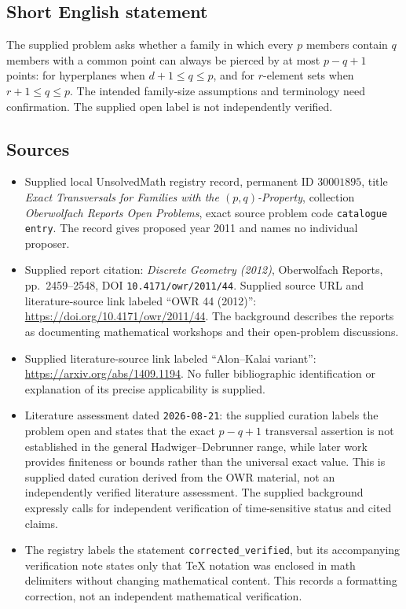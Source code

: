 \documentclass[11pt]{article}
\begin{document}
\subsection{Short English statement}
The supplied problem asks whether a family in which every \(p\) members contain \(q\) members with a common point can always be pierced by at most \(p-q+1\) points: for hyperplanes when \(d+1\le q\le p\), and for \(r\)-element sets when \(r+1\le q\le p\). The intended family-size assumptions and terminology need confirmation. The supplied open label is not independently verified.
\subsection{Sources}
\begin{itemize}
\item Supplied local UnsolvedMath registry record, permanent ID \(30001895\), title \emph{Exact Transversals for Families with the \((p,q)\)-Property}, collection \emph{Oberwolfach Reports Open Problems}, exact source problem code \texttt{catalogue entry}. The record gives proposed year 2011 and names no individual proposer.
\item Supplied report citation: \emph{Discrete Geometry (2012)}, Oberwolfach Reports, pp.\ 2459--2548, DOI \texttt{10.4171/owr/2011/44}. Supplied source URL and literature-source link labeled ``OWR 44 (2012)'': \url{https://doi.org/10.4171/owr/2011/44}. The background describes the reports as documenting mathematical workshops and their open-problem discussions.
\item Supplied literature-source link labeled ``Alon--Kalai variant'': \url{https://arxiv.org/abs/1409.1194}. No fuller bibliographic identification or explanation of its precise applicability is supplied.
\item Literature assessment dated \texttt{2026-08-21}: the supplied curation labels the problem open and states that the exact \(p-q+1\) transversal assertion is not established in the general Hadwiger--Debrunner range, while later work provides finiteness or bounds rather than the universal exact value. This is supplied dated curation derived from the OWR material, not an independently verified literature assessment. The supplied background expressly calls for independent verification of time-sensitive status and cited claims.
\item The registry labels the statement \texttt{corrected\_verified}, but its accompanying verification note states only that TeX notation was enclosed in math delimiters without changing mathematical content. This records a formatting correction, not an independent mathematical verification.
\end{itemize}
\end{document}
